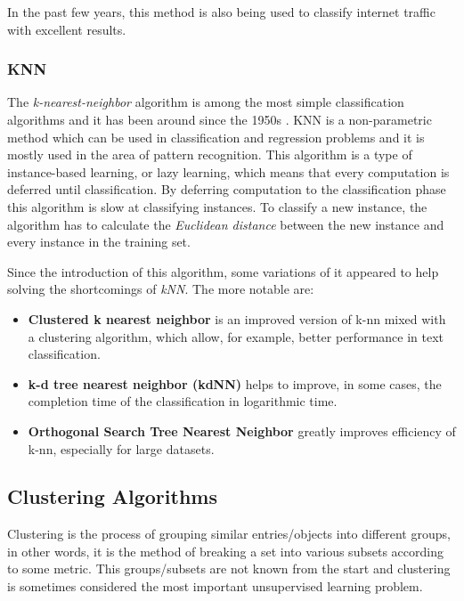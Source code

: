 In the past few years, this method is also being used to classify internet
traffic with excellent results.\cite{Yuan2010}


\subsubsection{KNN}

The \emph{k-nearest-neighbor} algorithm is among the most simple classification
algorithms and it has been around since the 1950s \cite[p.348]{HanKam06}. KNN is
a non-parametric method which can be used in classification and regression
problems and it is mostly used in the area of pattern recognition. This
algorithm is a type of instance-based learning, or lazy learning, which means
that every computation is deferred until classification. By deferring
computation to the classification phase this algorithm is slow at classifying
instances. To classify a new instance, the algorithm has to calculate the
\emph{Euclidean distance} between the new instance and every instance in the
training set.

Since the introduction of this algorithm, some variations of it appeared to help
solving the shortcomings of \emph{kNN}.\cite{DBLP:journals/corr/abs-1007-0085}
The more notable are: \begin{itemize} \item \textbf{Clustered k nearest
      neighbor} \cite{journals/jcp/ZhouLX09} is an improved version of k-nn
      mixed with a clustering algorithm, which allow, for example, better
    performance in text classification. \item \textbf{k-d tree nearest neighbor
      (kdNN)} \cite{Sproull1991} helps to improve, in some cases, the completion
      time of the classification in logarithmic time. \item \textbf{Orthogonal
    Search Tree Nearest Neighbor} \cite{955110} greatly improves efficiency of
k-nn, especially for large datasets. \end{itemize}

\subsection{Clustering Algorithms}\label{sec:clust}

Clustering is the process of grouping similar entries/objects into different
groups, in other words, it is the method of breaking a set into various subsets
according to some metric. This groups/subsets are not known from the start and
clustering is sometimes considered the most important unsupervised learning
problem\cite{DBLP:journals/corr/abs-1205-1117}.

